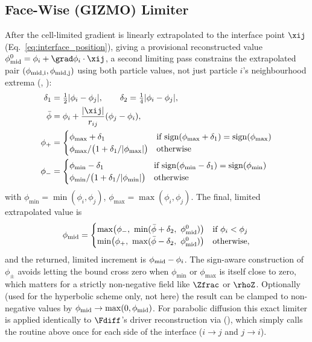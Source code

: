 \subsection{Face-Wise (GIZMO) Limiter}
\label{sec:face-limiter}
After the cell-limited gradient is linearly extrapolated to the
interface point $\xij$ (Eq.~\eqref{eq:interface_position}), giving a
provisional reconstructed value $\phi_{\rm mid}^{0} = \phi_i + \grad\phi_i
\cdot \xij$, a second limiting pass constrains the extrapolated pair
$(\phi_{\rm mid,i},\phi_{\rm mid,j})$ using both particle values, not
just particle $i$'s neighbourhood extrema
(,
):
\begin{align}
  \delta_1 &= \tfrac12 |\phi_i - \phi_j| , \qquad \delta_2 = \tfrac14 |\phi_i-\phi_j| , \\
  \bar\phi &= \phi_i + \frac{|\xij|}{r_{ij}}(\phi_j - \phi_i) , \\
  \phi_{+} &=
    \begin{cases}
      \phi_{\max} + \delta_1 & \text{if } \mathrm{sign}(\phi_{\max}+\delta_1) = \mathrm{sign}(\phi_{\max}) \\
      \phi_{\max}/\big(1+\delta_1/|\phi_{\max}|\big) & \text{otherwise}
    \end{cases} \\
  \phi_{-} &=
    \begin{cases}
      \phi_{\min} - \delta_1 & \text{if } \mathrm{sign}(\phi_{\min}-\delta_1) = \mathrm{sign}(\phi_{\min}) \\
      \phi_{\min}/\big(1+\delta_1/|\phi_{\min}|\big) & \text{otherwise}
    \end{cases}
\end{align}
with $\phi_{\min}=\min(\phi_i,\phi_j)$, $\phi_{\max}=\max(\phi_i,\phi_j)$.
The final, limited extrapolated value is
\begin{equation}
  \phi_{\rm mid} =
  \begin{cases}
    \max\!\big(\phi_-,\ \min(\bar\phi+\delta_2,\ \phi_{\rm mid}^{0})\big) & \text{if } \phi_i < \phi_j \\
    \min\!\big(\phi_+,\ \max(\bar\phi-\delta_2,\ \phi_{\rm mid}^{0})\big) & \text{otherwise,}
  \end{cases}
\end{equation}
and the returned, limited increment is $\phi_{\rm mid} - \phi_i$. The
sign-aware construction of $\phi_\pm$ avoids letting the bound cross zero
when $\phi_{\min}$ or $\phi_{\max}$ is itself close to zero, which
matters for a strictly non-negative field like $\Zfrac$ or $\rhoZ$.
Optionally (used for the hyperbolic scheme only, not here) the result can
be clamped to non-negative values by $\phi_{\rm mid}\to\max(0,\phi_{\rm
mid})$. For parabolic diffusion this exact limiter is applied
identically to $\Fdiff$'s driver reconstruction via
(), which simply
calls the routine above once for each side of the interface ($i\to j$
and $j\to i$).

